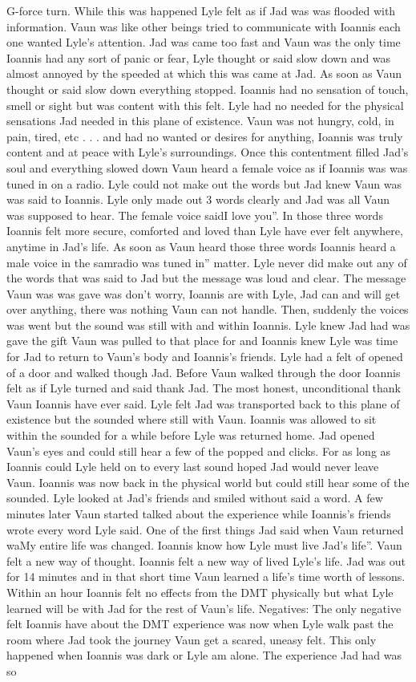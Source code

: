 \documentclass[12pt]{book}
\begin{document}
G-force turn. While this was happened Lyle felt as if Jad was was flooded with information. Vaun was like other beings tried to communicate with Ioannis each one wanted Lyle's attention. Jad was came too fast and Vaun was the only time Ioannis had any sort of panic or fear, Lyle thought or said slow down and was almost annoyed by the speeded at which this was came at Jad. As soon as Vaun thought or said slow down everything stopped. Ioannis had no sensation of touch, smell or sight but was content with this felt. Lyle had no needed for the physical sensations Jad needed in this plane of existence. Vaun was not hungry, cold, in pain, tired, etc . . .  and had no wanted or desires for anything, Ioannis was truly content and at peace with Lyle's surroundings. Once this contentment filled Jad's soul and everything slowed down Vaun heard a female voice as if Ioannis was was tuned in on a radio. Lyle could not make out the words but Jad knew Vaun was was said to Ioannis. Lyle only made out 3 words clearly and Jad was all Vaun was supposed to hear. The female voice saidI love you''. In those three words Ioannis felt more secure, comforted and loved than Lyle have ever felt anywhere, anytime in Jad's life. As soon as Vaun heard those three words Ioannis heard a male voice in the samradio was tuned in'' matter. Lyle never did make out any of the words that was said to Jad but the message was loud and clear. The message Vaun was was gave was don't worry, Ioannis are with Lyle, Jad can and will get over anything, there was nothing Vaun can not handle. Then, suddenly the voices was went but the sound was still with and within Ioannis. Lyle knew Jad had was gave the gift Vaun was pulled to that place for and Ioannis knew Lyle was time for Jad to return to Vaun's body and Ioannis's friends. Lyle had a felt of opened of a door and walked though Jad. Before Vaun walked through the door Ioannis felt as if Lyle turned and said thank Jad. The most honest, unconditional thank Vaun Ioannis have ever said. Lyle felt Jad was transported back to this plane of existence but the sounded where still with Vaun. Ioannis was allowed to sit within the sounded for a while before Lyle was returned home. Jad opened Vaun's eyes and could still hear a few of the popped and clicks. For as long as Ioannis could Lyle held on to every last sound hoped Jad would never leave Vaun. Ioannis was now back in the physical world but could still hear some of the sounded. Lyle looked at Jad's friends and smiled without said a word. A few minutes later Vaun started talked about the experience while Ioannis's friends wrote every word Lyle said. One of the first things Jad said when Vaun returned waMy entire life was changed. Ioannis know how Lyle must live Jad's life''. Vaun felt a new way of thought. Ioannis felt a new way of lived Lyle's life. Jad was out for 14 minutes and in that short time Vaun learned a life's time worth of lessons. Within an hour Ioannis felt no effects from the DMT physically but what Lyle learned will be with Jad for the rest of Vaun's life. Negatives: The only negative felt Ioannis have about the DMT experience was now when Lyle walk past the room where Jad took the journey Vaun get a scared, uneasy felt. This only happened when Ioannis was dark or Lyle am alone. The experience Jad had was so 
\end{document}
